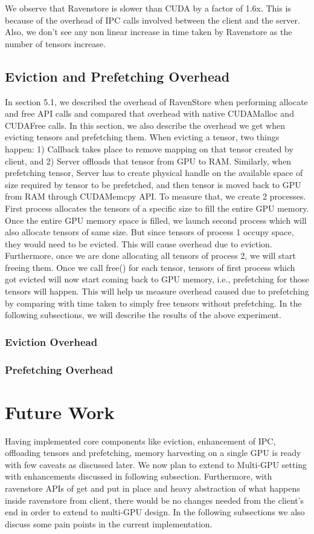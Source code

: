 \documentclass{article}
\begin{document}
We observe that Ravenstore is slower than CUDA by a factor of 1.6x. This is because of the overhead of IPC calls involved between the client and the server. Also, we don't see any non linear increase in time taken by Ravenstore as the number of tensors increase.

\subsection{Eviction and Prefetching Overhead}
In section 5.1, we described the overhead of RavenStore when performing allocate and free API calls and compared that overhead with 
native CUDAMalloc and CUDAFree calls. In this section, we also describe the overhead we get when evicting tensors and prefetching them.
When evicting a tensor, two things happen: 1) Callback takes place to remove mapping on that tensor created by client, and 2) Server
offloads that tensor from GPU to RAM. Similarly, when prefetching tensor, Server has to create physical handle on the available space of
size required by tensor to be prefetched, and then tensor is moved back to GPU from RAM through CUDAMemcpy API.
To measure that, we create 2 processes. First process allocates the tensors of a specific size to fill the entire GPU memory. Once the entire GPU
memory space is filled, we launch second process which will also allocate tensors of same size. But since tensors of process 1 occupy space, they would
need to be evicted. This will cause overhead due to eviction. Furthermore, once we are done allocating all tensors of process 2, we will start freeing them.
Once we call free() for each tensor, tensors of first process which got evicted will now start coming back to GPU memory, i.e., prefetching for those
tensors will happen. This will help us measure overhead caused due to prefetching by comparing with time taken to simply free tensors without prefetching.
In the following subsections, we will describe the results of the above experiment.

\subsubsection{Eviction Overhead}
\subsubsection{Prefetching Overhead}

\section{Future Work}
Having implemented core components like eviction, enhancement of IPC, offloading tensors and prefetching, memory harvesting
on a single GPU is ready with few caveats as discussed later. We now plan
to extend to Multi-GPU setting with enhancements discussed in following subsection. 
Furthermore, with ravenstore APIs of get and put in place and heavy abstraction of what
happens inside ravenstore from client, there would be no changes needed from the client's end
in order to extend to multi-GPU design. In the following subsections we also discuss some pain points in the current implementation.
\end{document}
